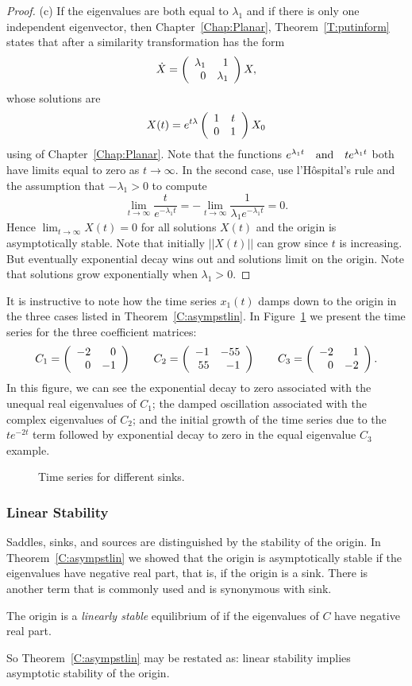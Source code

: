 \documentclass{ximera}
\begin{document}
\begin{proof}
\noindent (c) \quad If the eigenvalues are both equal to $\lambda_1$
and if there is only one independent eigenvector, then
Chapter~\ref{Chap:Planar}, Theorem~\ref{T:putinform} states that after a
similarity transformation  has the form
\[
\dot{X} = \left(\begin{array}{rr} \lambda_1 & 1\\ 0 &\lambda_1\end{array}\right)X,
\]
whose solutions are
\[
X(t) = e^{t\lambda}\left(\begin{array}{cc} 1 & t\\ 0 &1\end{array}\right) X_0
\]
using  of Chapter~\ref{Chap:Planar}. Note that the functions
$e^{\lambda_1 t} \quad\mbox{and}\quad te^{\lambda_1 t}$ both have limits equal to zero as
$t\to\infty$.  In the second case, use l'H\^{o}spital's rule and the
assumption that $-\lambda_1>0$ to compute
\[
\lim_{t\to\infty} \frac{t}{e^{-\lambda_1 t}} =
  -\lim_{t\to\infty} \frac{1}{\lambda_1 e^{-\lambda_1 t}} = 0.
\]
Hence $\lim_{t\to\infty} X(t) =0$ for all solutions $X(t)$ and the origin
is asymptotically stable.  Note that initially $||X(t)||$ can grow since
$t$ is increasing.  But eventually exponential decay wins out and solutions
limit on the origin.   Note that solutions grow exponentially when
$\lambda_1>0$.  \end{proof}

It is instructive to note how the time series $x_1(t)$ damps down to the
origin in the three cases listed in Theorem~\ref{C:asympstlin}.
In Figure~\ref{F:oscil} we present the time series for the three
coefficient matrices:
\[
C_1 = \left(\begin{array}{rr} -2 & 0\\ 0 &-1\end{array}\right) \qquad
C_2 = \left(\begin{array}{rr} -1 & -55\\ 55 &-1\end{array}\right) \qquad
C_3 = \left(\begin{array}{rr} -2 & 1\\ 0 &-2\end{array}\right).
\]
In this figure, we can see the exponential decay to zero associated with the
unequal real eigenvalues of $C_1$; the damped oscillation associated with the
complex eigenvalues of $C_2$; and the initial growth of the time series due
to the $te^{-2t}$ term followed by exponential decay to zero in the equal
eigenvalue $C_3$ example.

\begin{figure}[htb]
           \centerline{%
	   }
           \caption{Time series for different sinks.}
           \label{F:oscil}
\end{figure}


\subsubsection*{Linear Stability}

Saddles, sinks, and sources are distinguished by the stability of the
origin.  In Theorem~\ref{C:asympstlin} we showed that the origin is
asymptotically stable if the eigenvalues have negative real part, that is,
if the origin is a sink.  There is another term that is commonly used and
is synonymous with sink.
\begin{Def} \label{D:linstablin}
The origin is a {\em linearly stable\/} equilibrium of  if the
eigenvalues of $C$ have negative real part.
\end{Def}
So Theorem~\ref{C:asympstlin} may be restated as: linear stability
implies asymptotic stability of the origin.
\end{document}
